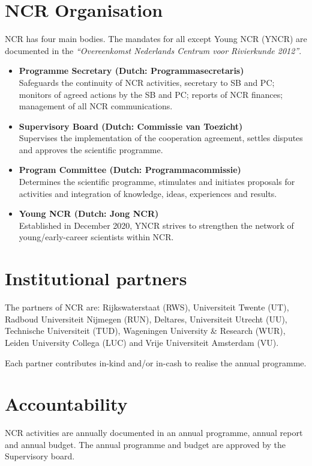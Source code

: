 \begin{multicols}{2}
\section{NCR Organisation}

NCR has four main bodies. The mandates for all except Young NCR (YNCR) are documented in the \emph{“Overeenkomst Nederlands Centrum voor Rivierkunde 2012”}.

\begin{itemize}
\item \textbf{Programme Secretary (Dutch: Programmasecretaris)} \\
Safeguards the continuity of NCR activities, secretary to SB and PC; monitors of agreed actions by the SB and PC; reports of NCR finances; management of all NCR communications.
\item \textbf{Supervisory Board (Dutch: Commissie van Toezicht)}\\ 
Supervises the implementation of the cooperation agreement, settles disputes and approves the scientific programme.
\item \textbf{Program Committee (Dutch: Programmacommissie)} \\
Determines the scientific programme, stimulates and initiates proposals for activities and integration of knowledge, ideas, experiences and results.
\item \textbf{Young NCR (Dutch: Jong NCR)} \\
Established in December 2020, YNCR strives to strengthen the network of young/early-career scientists within NCR. 
\end{itemize}

\section{Institutional partners}
The partners of NCR are: Rijkswaterstaat (RWS), Universiteit Twente (UT), Radboud Universiteit Nijmegen (RUN), Deltares, Universiteit Utrecht (UU), Technische Universiteit (TUD), Wageningen University \& Research (WUR), Leiden University Collega (LUC) and Vrije Universiteit Amsterdam (VU).

Each partner contributes in-kind and/or in-cash to realise the annual programme.  

\section{Accountability}
NCR activities are annually documented in an annual programme, annual report and annual budget. The annual programme and budget are approved by the Supervisory board. 

\end{multicols}



